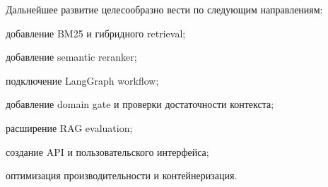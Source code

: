Дальнейшее развитие целесообразно вести по следующим направлениям:
\begin{compactenum}
  \item добавление BM25 и гибридного retrieval;
  \item добавление semantic reranker;
  \item подключение LangGraph workflow;
  \item добавление domain gate и проверки достаточности контекста;
  \item расширение RAG evaluation;
  \item создание API и пользовательского интерфейса;
  \item оптимизация производительности и контейнеризация.
\end{compactenum}

